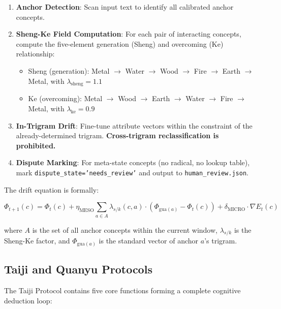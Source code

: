 \documentclass[11pt,a4paper]{article}
\begin{document}
\begin{enumerate}
    \item \textbf{Anchor Detection}: Scan input text to identify all calibrated anchor concepts.
    \item \textbf{Sheng-Ke Field Computation}: For each pair of interacting concepts, compute the five-element generation (Sheng) and overcoming (Ke) relationship:
    \begin{itemize}
        \item Sheng (generation): Metal $\rightarrow$ Water $\rightarrow$ Wood $\rightarrow$ Fire $\rightarrow$ Earth $\rightarrow$ Metal, with $\lambda_{\text{sheng}} = 1.1$
        \item Ke (overcoming): Metal $\rightarrow$ Wood $\rightarrow$ Earth $\rightarrow$ Water $\rightarrow$ Fire $\rightarrow$ Metal, with $\lambda_{\text{ke}} = 0.9$
    \end{itemize}
    \item \textbf{In-Trigram Drift}: Fine-tune attribute vectors within the constraint of the already-determined trigram. \textbf{Cross-trigram reclassification is prohibited.}
    \item \textbf{Dispute Marking}: For meta-state concepts (no radical, no lookup table), mark \texttt{dispute\_state='needs\_review'} and output to \texttt{human\_review.json}.
\end{enumerate}

The drift equation is formally:

\[
\Phi_{t+1}(c) = \Phi_t(c) + \eta_{\text{MESO}} \sum_{a \in A} \lambda_{s/k}(c, a) \cdot (\Phi_{\text{gua}(a)} - \Phi_t(c)) + \delta_{\text{MICRO}} \cdot \nabla E_t(c)
\]

where $A$ is the set of all anchor concepts within the current window, $\lambda_{s/k}$ is the Sheng-Ke factor, and $\Phi_{\text{gua}(a)}$ is the standard vector of anchor $a$'s trigram.

\subsection{Taiji and Quanyu Protocols}

The Taiji Protocol contains five core functions forming a complete cognitive deduction loop:
\end{document}
